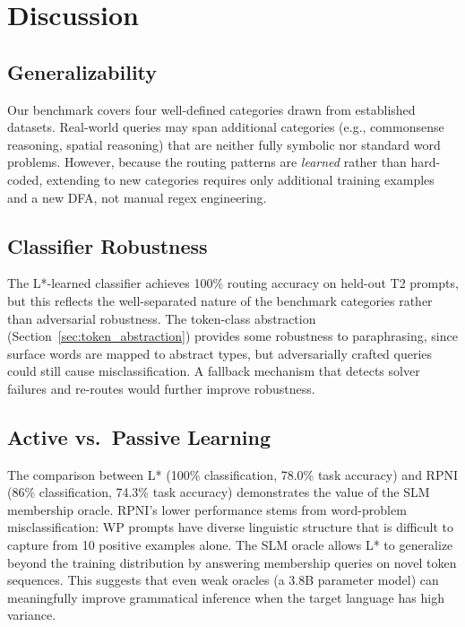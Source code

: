 \documentclass[journal]{IEEEtai}
\begin{document}
\section{Discussion}
\label{sec:discussion}

\subsection{Generalizability}
Our benchmark covers four well-defined categories drawn from established datasets. Real-world queries may span additional categories (e.g., commonsense reasoning, spatial reasoning) that are neither fully symbolic nor standard word problems. However, because the routing patterns are \emph{learned} rather than hard-coded, extending to new categories requires only additional training examples and a new DFA, not manual regex engineering.

\subsection{Classifier Robustness}
\label{sec:classifier_robustness}
The L*-learned classifier achieves 100\% routing accuracy on held-out T2 prompts, but this reflects the well-separated nature of the benchmark categories rather than adversarial robustness. The token-class abstraction (Section~\ref{sec:token_abstraction}) provides some robustness to paraphrasing, since surface words are mapped to abstract types, but adversarially crafted queries could still cause misclassification. A fallback mechanism that detects solver failures and re-routes would further improve robustness.

\subsection{Active vs.\ Passive Learning}
The comparison between L* (100\% classification, 78.0\% task accuracy) and RPNI (86\% classification, 74.3\% task accuracy) demonstrates the value of the SLM membership oracle. RPNI's lower performance stems from word-problem misclassification: WP prompts have diverse linguistic structure that is difficult to capture from 10 positive examples alone. The SLM oracle allows L* to generalize beyond the training distribution by answering membership queries on novel token sequences. This suggests that even weak oracles (a 3.8B parameter model) can meaningfully improve grammatical inference when the target language has high variance.
\end{document}
